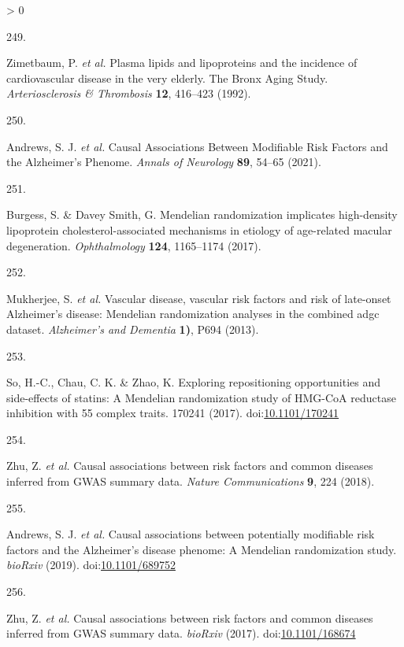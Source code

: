 \documentclass[a4paper, twoside]{templates/ociamthesis}
\newlength{\cslhangindent}
\newlength{\csllabelwidth}
\newenvironment{CSLReferences}[3] %
 {%
  \setlength{\parindent}{0pt}
  \ifodd #1 \everypar{\setlength{\hangindent}{\cslhangindent}}\ignorespaces\fi
  \ifnum #2 > 0
  \setlength{\parskip}{#2\baselineskip}
  \fi
 }%
 {}
\newcommand{\CSLLeftMargin}[1]{\parbox[t]{\maxof{\widthof{#1}}{\csllabelwidth}}{#1}}
\newcommand{\CSLRightInline}[1]{\parbox[t]{\linewidth - \csllabelwidth}{#1}}
\begin{document}
\begin{CSLReferences}{0}{0}
\leavevmode\hypertarget{ref-zimetbaum1992}{}%
\CSLLeftMargin{249. }
\CSLRightInline{Zimetbaum, P. \emph{et al.} Plasma lipids and lipoproteins and the incidence of cardiovascular disease in the very elderly. {The Bronx Aging Study}. \emph{Arteriosclerosis \& Thrombosis} \textbf{12}, 416--423 (1992).}

\leavevmode\hypertarget{ref-andrews2021}{}%
\CSLLeftMargin{250. }
\CSLRightInline{Andrews, S. J. \emph{et al.} Causal {Associations Between Modifiable Risk Factors} and the {Alzheimer}'s {Phenome}. \emph{Annals of Neurology} \textbf{89}, 54--65 (2021).}

\leavevmode\hypertarget{ref-burgess2017}{}%
\CSLLeftMargin{251. }
\CSLRightInline{Burgess, S. \& Davey Smith, G. Mendelian randomization implicates high-density lipoprotein cholesterol-associated mechanisms in etiology of age-related macular degeneration. \emph{Ophthalmology} \textbf{124}, 1165--1174 (2017).}

\leavevmode\hypertarget{ref-mukherjee2013}{}%
\CSLLeftMargin{252. }
\CSLRightInline{Mukherjee, S. \emph{et al.} Vascular disease, vascular risk factors and risk of late-onset {Alzheimer}'s disease: Mendelian randomization analyses in the combined adgc dataset. \emph{Alzheimer's and Dementia} \textbf{1)}, P694 (2013).}

\leavevmode\hypertarget{ref-so2017}{}%
\CSLLeftMargin{253. }
\CSLRightInline{So, H.-C., Chau, C. K. \& Zhao, K. Exploring repositioning opportunities and side-effects of statins: A {Mendelian} randomization study of {HMG}-{CoA} reductase inhibition with 55 complex traits. 170241 (2017). doi:\href{https://doi.org/10.1101/170241}{10.1101/170241}}

\leavevmode\hypertarget{ref-zhu2018}{}%
\CSLLeftMargin{254. }
\CSLRightInline{Zhu, Z. \emph{et al.} Causal associations between risk factors and common diseases inferred from {GWAS} summary data. \emph{Nature Communications} \textbf{9}, 224 (2018).}

\leavevmode\hypertarget{ref-andrews2019}{}%
\CSLLeftMargin{255. }
\CSLRightInline{Andrews, S. J. \emph{et al.} Causal associations between potentially modifiable risk factors and the {Alzheimer}'s disease phenome: A {Mendelian} randomization study. \emph{bioRxiv} (2019). doi:\href{https://doi.org/10.1101/689752}{10.1101/689752}}

\leavevmode\hypertarget{ref-zhu2017}{}%
\CSLLeftMargin{256. }
\CSLRightInline{Zhu, Z. \emph{et al.} Causal associations between risk factors and common diseases inferred from {GWAS} summary data. \emph{bioRxiv} (2017). doi:\href{https://doi.org/10.1101/168674}{10.1101/168674}}


\end{CSLReferences}
\end{document}
